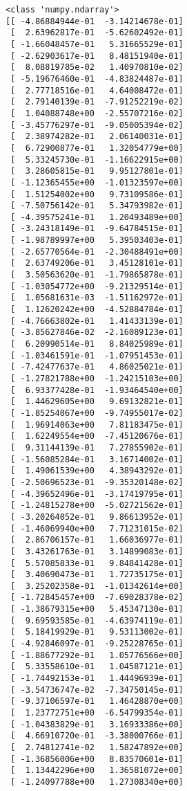 \documentclass[11pt]{article}
\begin{document}
    \begin{Verbatim}[commandchars=\\\{\}]
<class 'numpy.ndarray'>
[[ -4.86884944e-01  -3.14214678e-01]
 [  2.63962817e-01  -5.62602492e-01]
 [ -1.66048457e-01   5.31665529e-01]
 [ -2.62903617e-01   8.48151940e-01]
 [  8.08819785e-02   1.40970810e-02]
 [ -5.19676460e-01  -4.83824487e-01]
 [  2.77718516e-01   4.64008472e-01]
 [  2.79140139e-01  -7.91252219e-02]
 [  1.04088748e+00  -2.55707216e-02]
 [ -3.45776297e-01  -9.05005394e-02]
 [  2.38974282e-01   2.06140031e-01]
 [  6.72900877e-01   1.32054779e+00]
 [  5.33245730e-01  -1.16622915e+00]
 [  3.28605815e-01   9.95127801e-01]
 [ -1.12365455e+00  -1.01323597e+00]
 [  1.51254002e+00   9.73109586e-01]
 [ -7.50756142e-01   5.34793982e-01]
 [ -4.39575241e-01   1.20493489e+00]
 [ -3.24318149e-01  -9.64784515e-01]
 [ -1.98789997e+00   5.39503403e-01]
 [ -2.65770564e-01  -2.30488491e+00]
 [  2.63749206e-01   3.45128101e-01]
 [  3.50563620e-01  -1.79865878e-01]
 [ -1.03054772e+00  -9.21329514e-01]
 [  1.05681631e-03  -1.51162972e-01]
 [  1.12620242e+00  -4.52884784e-01]
 [ -4.76663802e-01   1.41433139e-01]
 [ -3.85627846e-02  -2.16089123e-01]
 [  6.20990514e-01   8.84025989e-01]
 [ -1.03461591e-01  -1.07951453e-01]
 [ -7.42477637e-01   4.86025021e-01]
 [ -1.27821788e+00  -1.24215103e+00]
 [  6.93377428e-01  -1.93464540e+00]
 [  1.44629605e+00   9.69132821e-01]
 [ -1.85254067e+00  -9.74955017e-02]
 [  1.96914063e+00   7.81183475e-01]
 [  1.62249554e+00  -7.45120676e-01]
 [  9.31144139e-01   7.27855902e-01]
 [ -1.56085284e-01   3.16714002e-01]
 [  1.49061539e+00   4.38943292e-01]
 [ -2.50696523e-01  -9.35320148e-02]
 [ -4.39652496e-01  -3.17419795e-01]
 [ -1.24815278e+00  -5.02721562e-01]
 [ -3.20264052e-01   9.86613952e-01]
 [ -1.46069940e+00   7.71231015e-02]
 [  2.86706157e-01   1.66036977e-01]
 [  3.43261763e-01   3.14899083e-01]
 [  5.57085833e-01   9.84841428e-01]
 [  3.40690473e-01   1.72735175e-01]
 [  3.25202358e-01  -1.01342614e+00]
 [ -1.72845457e+00  -7.69028378e-02]
 [ -1.38679315e+00   5.45347130e-01]
 [  9.69593585e-01  -4.63974119e-01]
 [  5.18419929e-01   9.53113002e-01]
 [ -4.92846097e-01  -9.25228765e-01]
 [ -1.88677292e-01   1.05776566e+00]
 [  5.33558610e-01   1.04587121e-01]
 [ -1.74492153e-01   1.44496939e-01]
 [ -3.54736747e-02  -7.34750145e-01]
 [ -9.37106597e-01   1.46428870e+00]
 [  1.23772751e+00  -6.54799354e-01]
 [ -1.04383829e-01   3.16933386e+00]
 [  4.66910720e-01  -3.38000766e-01]
 [  2.74812741e-02   1.58247892e+00]
 [ -1.36856006e+00   8.83570601e-01]
 [  1.13442296e+00   1.36581072e+00]
 [ -1.24097788e+00   1.27308340e+00]

\end{Verbatim}
\end{document}
